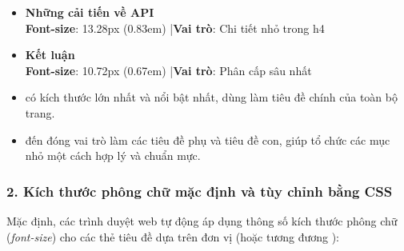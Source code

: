 \begin{tcolorbox}
\begin{itemize}[leftmargin=0pt, label={}, itemsep=10pt, parsep=0pt]
    \item {\fontsize{9.5pt}{12pt}\selectfont\sffamily\bfseries\color{darkText} Những cải tiến về API}\\[3pt]
           \hfill {\scriptsize\color{codeComment}\textbf{Font-size}: 13.28px (0.83em) \quad|\quad \textbf{Vai trò}: Chi tiết nhỏ trong h4}

    \item {\fontsize{8.5pt}{11pt}\selectfont\sffamily\bfseries\color{codeComment} Kết luận}\\[3pt]
           \hfill {\scriptsize\color{codeComment}\textbf{Font-size}: 10.72px (0.67em) \quad|\quad \textbf{Vai trò}: Phân cấp sâu nhất}
\end{itemize}
\end{tcolorbox}

\begin{noteBox}
\begin{itemize}[leftmargin=1.5em, itemsep=2pt, parsep=0pt]
    \item {} có kích thước lớn nhất và nổi bật nhất, dùng làm tiêu đề chính của toàn bộ trang.
    \item {} đến  đóng vai trò làm các tiêu đề phụ và tiêu đề con, giúp tổ chức các mục nhỏ một cách hợp lý và chuẩn mực.
\end{itemize}
\end{noteBox}

\subsubsection{2. Kích thước phông chữ mặc định và tùy chỉnh bằng CSS}

Mặc định, các trình duyệt web tự động áp dụng thông số kích thước phông chữ (\textit{font-size}) cho các thẻ tiêu đề dựa trên đơn vị  (hoặc tương đương ):

